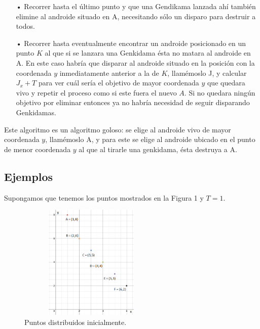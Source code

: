 \documentclass[10pt,a4paper]{article}
\begin{document}
\begin{itemize}
\item[•] Recorrer hasta el último punto y que una Gendikama lanzada ahí también elimine al androide situado en A, necesitando sólo un disparo para destruir a todos.
\item[•] Recorrer hasta eventualmente encontrar un androide posicionado en un punto $K$ al que si se lanzara una Genkidama ésta no matara al androide en A. En este caso habría que disparar al androide situado en la posición con la coordenada $y$ inmediatamente anterior a la de $K$, llamémoslo J, y calcular $J_{x}+T$ para ver cuál sería el objetivo de mayor coordenada $y$ que quedara vivo  y repetir el proceso como si este fuera el nuevo $A$. Si no quedara ningún objetivo por eliminar entonces ya no habría necesidad de seguir disparando Genkidamas.
\end{itemize}

\par{Este algoritmo es un algoritmo goloso: se elige al androide vivo de mayor coordenada $y$, llamémoslo A, y para este se elige al androide ubicado en el punto de menor coordenada $y$ al que al tirarle una genkidama, ésta destruya a A.}

\subsection{Ejemplos}

Supongamos que tenemos los puntos mostrados en la Figura 1 y $T = 1$.
\begin{figure}[h!]
  \centering
  \includegraphics[width=7cm, height=5.5cm]{EjemploInicialUtil}
  \caption{Puntos distribuidos inicialmente.}
\end{figure}
\end{document}
